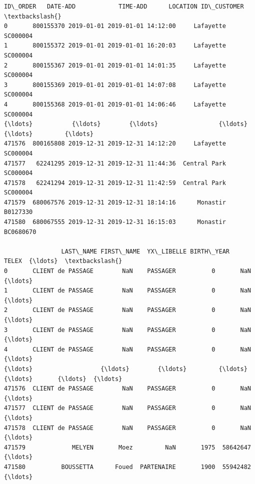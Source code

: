\documentclass[11pt]{article}
\makeatletter
\newcommand{\boxspacing}{\kern\kvtcb@left@rule\kern\kvtcb@boxsep}
\newcommand{\prompt}[4]{
        \ttfamily\llap{{\color{#2}[#3]:\hspace{3pt}#4}}\vspace{-\baselineskip}
    }
\makeatother
\begin{document}
            \begin{tcolorbox}[breakable, size=fbox, boxrule=.5pt, pad at break*=1mm, opacityfill=0]
\prompt{Out}{outcolor}{14}{\boxspacing}
\begin{Verbatim}[commandchars=\\\{\}]
         ID\_ORDER   DATE-ADD            TIME-ADD      LOCATION ID\_CUSTOMER  \textbackslash{}
0       800155370 2019-01-01 2019-01-01 14:12:00     Lafayette    SC000004
1       800155372 2019-01-01 2019-01-01 16:20:03     Lafayette    SC000004
2       800155367 2019-01-01 2019-01-01 14:01:35     Lafayette    SC000004
3       800155369 2019-01-01 2019-01-01 14:07:08     Lafayette    SC000004
4       800155368 2019-01-01 2019-01-01 14:06:46     Lafayette    SC000004
{\ldots}           {\ldots}        {\ldots}                 {\ldots}           {\ldots}         {\ldots}
471576  800165808 2019-12-31 2019-12-31 14:12:20     Lafayette    SC000004
471577   62241295 2019-12-31 2019-12-31 11:44:36  Central Park    SC000004
471578   62241294 2019-12-31 2019-12-31 11:42:59  Central Park    SC000004
471579  680067576 2019-12-31 2019-12-31 18:14:16      Monastir    B0127330
471580  680067555 2019-12-31 2019-12-31 16:15:03      Monastir   BC0680670

                LAST\_NAME FIRST\_NAME  YX\_LIBELLE BIRTH\_YEAR     TELEX  {\ldots}  \textbackslash{}
0       CLIENT de PASSAGE        NaN    PASSAGER          0       NaN  {\ldots}
1       CLIENT de PASSAGE        NaN    PASSAGER          0       NaN  {\ldots}
2       CLIENT de PASSAGE        NaN    PASSAGER          0       NaN  {\ldots}
3       CLIENT de PASSAGE        NaN    PASSAGER          0       NaN  {\ldots}
4       CLIENT de PASSAGE        NaN    PASSAGER          0       NaN  {\ldots}
{\ldots}                   {\ldots}        {\ldots}         {\ldots}        {\ldots}       {\ldots}  {\ldots}
471576  CLIENT de PASSAGE        NaN    PASSAGER          0       NaN  {\ldots}
471577  CLIENT de PASSAGE        NaN    PASSAGER          0       NaN  {\ldots}
471578  CLIENT de PASSAGE        NaN    PASSAGER          0       NaN  {\ldots}
471579             MELYEN       Moez         NaN       1975  58642647  {\ldots}
471580          BOUSSETTA      Foued  PARTENAIRE       1900  55942482  {\ldots}


\end{Verbatim}
\end{tcolorbox}
\end{document}
